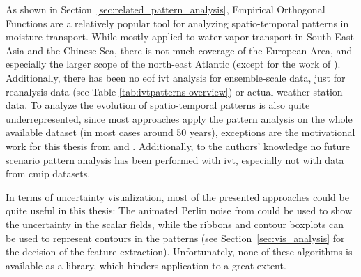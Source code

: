As shown in Section~\ref{sec:related_pattern_analysis}, Empirical Orthogonal Functions are a relatively popular tool for analyzing spatio-temporal patterns in moisture transport. 
While mostly applied to water vapor transport in South East Asia and the Chinese Sea, there is not much coverage of the European Area, and especially the larger scope of the north-east Atlantic (except for the work of \citeauthor{wypych_atmospheric_2018} \cite{wypych_atmospheric_2018}). 
Additionally, there has been no \ac{eof} \ac{ivt} analysis for ensemble-scale data, just for reanalysis data (see Table \ref{tab:ivtpatterns-overview}) or actual weather station data.
To analyze the evolution of spatio-temporal patterns is also quite underrepresented, since most approaches apply the pattern analysis on the whole available dataset (in most cases around 50 years), exceptions are the motivational work for this thesis from  and . 
Additionally, to the authors' knowledge no future scenario pattern analysis has been performed with \ac{ivt}, especially not with data from \ac{cmip} datasets.  

In terms of uncertainty visualization, most of the presented approaches could be quite useful in this thesis: The animated Perlin noise from \cite{coninx_visualization_2011} could be used to show the uncertainty in the scalar fields, while the ribbons and contour boxplots can be used to represent contours in the patterns (see Section~\ref{sec:vis_analysis} for the decision of the feature extraction). 
Unfortunately, none of these algorithms is available as a library, which hinders application to a great extent. 


